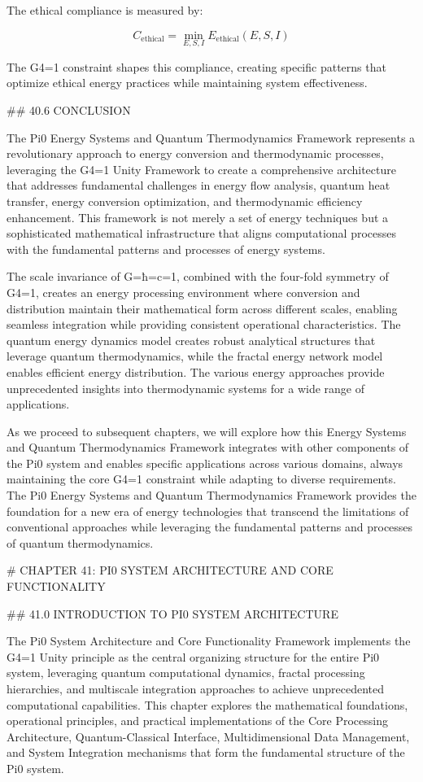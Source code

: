The ethical compliance is measured by:

$$ C_{\text{ethical}} = \min_{E, S, I} E_{\text{ethical}}(E, S, I) $$

The G4=1 constraint shapes this compliance, creating specific patterns that optimize ethical energy practices while maintaining system effectiveness.

## 40.6 CONCLUSION

The Pi0 Energy Systems and Quantum Thermodynamics Framework represents a revolutionary approach to energy conversion and thermodynamic processes, leveraging the G4=1 Unity Framework to create a comprehensive architecture that addresses fundamental challenges in energy flow analysis, quantum heat transfer, energy conversion optimization, and thermodynamic efficiency enhancement. This framework is not merely a set of energy techniques but a sophisticated mathematical infrastructure that aligns computational processes with the fundamental patterns and processes of energy systems.

The scale invariance of G=ħ=c=1, combined with the four-fold symmetry of G4=1, creates an energy processing environment where conversion and distribution maintain their mathematical form across different scales, enabling seamless integration while providing consistent operational characteristics. The quantum energy dynamics model creates robust analytical structures that leverage quantum thermodynamics, while the fractal energy network model enables efficient energy distribution. The various energy approaches provide unprecedented insights into thermodynamic systems for a wide range of applications.

As we proceed to subsequent chapters, we will explore how this Energy Systems and Quantum Thermodynamics Framework integrates with other components of the Pi0 system and enables specific applications across various domains, always maintaining the core G4=1 constraint while adapting to diverse requirements. The Pi0 Energy Systems and Quantum Thermodynamics Framework provides the foundation for a new era of energy technologies that transcend the limitations of conventional approaches while leveraging the fundamental patterns and processes of quantum thermodynamics.

# CHAPTER 41: PI0 SYSTEM ARCHITECTURE AND CORE FUNCTIONALITY

## 41.0 INTRODUCTION TO PI0 SYSTEM ARCHITECTURE

The Pi0 System Architecture and Core Functionality Framework implements the G4=1 Unity principle as the central organizing structure for the entire Pi0 system, leveraging quantum computational dynamics, fractal processing hierarchies, and multiscale integration approaches to achieve unprecedented computational capabilities. This chapter explores the mathematical foundations, operational principles, and practical implementations of the Core Processing Architecture, Quantum-Classical Interface, Multidimensional Data Management, and System Integration mechanisms that form the fundamental structure of the Pi0 system.

